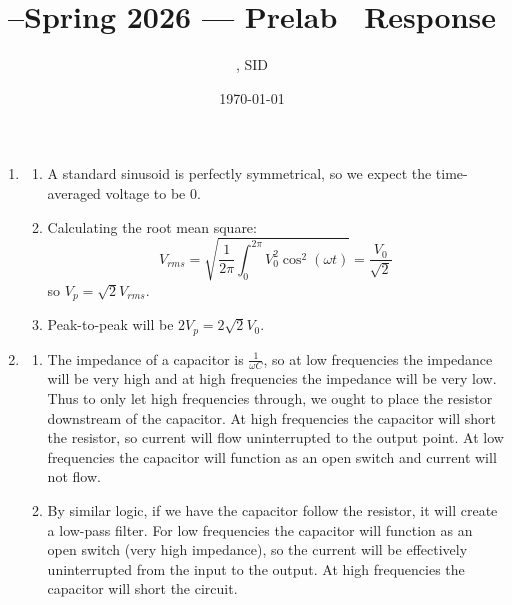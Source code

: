 \documentclass[11pt]{article}
\title{\Cls--Spring 2026 --- Prelab \Prelab \ Response}
\author{\Name, SID \SID}
\date{\today}
\newenvironment{qparts}{\begin{enumerate}[{(}a{)}]}{\end{enumerate}}
\begin{document}
\maketitle
\begin{enumerate}
    \item \begin{qparts}
              \item A standard sinusoid is perfectly symmetrical, so we expect the time-averaged voltage to be 0.
              \item Calculating the root mean square: $$V_{rms} = \sqrt{\frac{1}{2\pi} \int^{2\pi}_0 V_0^2 \cos^2(\omega t)} = \frac{V_0}{\sqrt{2}}$$ so $V_p = \sqrt{2} V_{rms}$.
              \item Peak-to-peak will be $2V_p = 2\sqrt{2} V_0$.
          \end{qparts}
    \item \begin{qparts}
              \item The impedance of a capacitor is $\frac{1}{\omega C}$, so at low frequencies the impedance will be very high and at high frequencies the impedance will be very low. Thus to only let high frequencies through, we ought to place the resistor downstream of the capacitor. At high frequencies the capacitor will short the resistor, so current will flow uninterrupted to the output point. At low frequencies the capacitor will function as an open switch and current will not flow.
              \item By similar logic, if we have the capacitor follow the resistor, it will create a low-pass filter. For low frequencies the capacitor will function as an open switch (very high impedance), so the current will be effectively uninterrupted from the input to the output. At high frequencies the capacitor will short the circuit.
          \end{qparts}
\end{enumerate}
\end{document}
